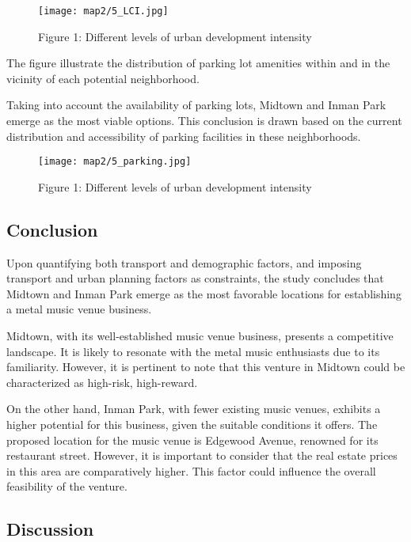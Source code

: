\documentclass[11pt]{article}
\begin{document}
\begin{figure}[H]
\begin{center}
\centering
\texttt{[image: map2/5\_LCI.jpg]}
\caption{Figure 1: Different levels of urban development intensity}
\label{fig:figure1}
\end{center}
\end{figure}

The figure illustrate the distribution of parking lot amenities within and in the vicinity of each potential neighborhood. 

Taking into account the availability of parking lots, Midtown and Inman Park emerge as the most viable options. This conclusion is drawn based on the current distribution and accessibility of parking facilities in these neighborhoods.

\begin{figure}[H]
\begin{center}
\centering
\texttt{[image: map2/5\_parking.jpg]}
\caption{Figure 1: Different levels of urban development intensity}
\label{fig:figure1}
\end{center}
\end{figure}

\subsection{Conclusion}
Upon quantifying both transport and demographic factors, and imposing transport and urban planning factors as constraints, the study concludes that Midtown and Inman Park emerge as the most favorable locations for establishing a metal music venue business.

Midtown, with its well-established music venue business, presents a competitive landscape. It is likely to resonate with the metal music enthusiasts due to its familiarity. However, it is pertinent to note that this venture in Midtown could be characterized as high-risk, high-reward.

On the other hand, Inman Park, with fewer existing music venues, exhibits a higher potential for this business, given the suitable conditions it offers. The proposed location for the music venue is Edgewood Avenue, renowned for its restaurant street. However, it is important to consider that the real estate prices in this area are comparatively higher. This factor could influence the overall feasibility of the venture.

\subsection{Discussion}
\end{document}
